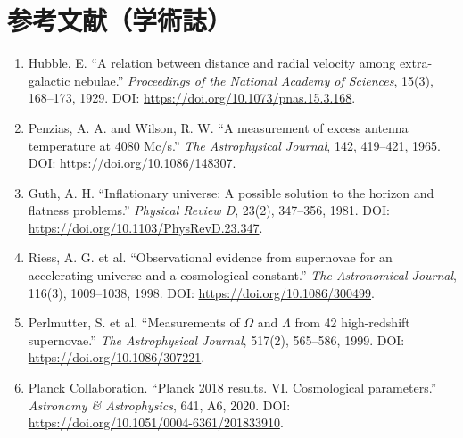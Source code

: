 \section*{参考文献（学術誌）}
\begin{enumerate}[leftmargin=2.4em]
\item Hubble, E. ``A relation between distance and radial velocity among extra-galactic nebulae.'' \textit{Proceedings of the National Academy of Sciences}, 15(3), 168--173, 1929. DOI: \url{https://doi.org/10.1073/pnas.15.3.168}.
\item Penzias, A. A. and Wilson, R. W. ``A measurement of excess antenna temperature at 4080 Mc/s.'' \textit{The Astrophysical Journal}, 142, 419--421, 1965. DOI: \url{https://doi.org/10.1086/148307}.
\item Guth, A. H. ``Inflationary universe: A possible solution to the horizon and flatness problems.'' \textit{Physical Review D}, 23(2), 347--356, 1981. DOI: \url{https://doi.org/10.1103/PhysRevD.23.347}.
\item Riess, A. G. et al. ``Observational evidence from supernovae for an accelerating universe and a cosmological constant.'' \textit{The Astronomical Journal}, 116(3), 1009--1038, 1998. DOI: \url{https://doi.org/10.1086/300499}.
\item Perlmutter, S. et al. ``Measurements of \(\Omega\) and \(\Lambda\) from 42 high-redshift supernovae.'' \textit{The Astrophysical Journal}, 517(2), 565--586, 1999. DOI: \url{https://doi.org/10.1086/307221}.
\item Planck Collaboration. ``Planck 2018 results. VI. Cosmological parameters.'' \textit{Astronomy \& Astrophysics}, 641, A6, 2020. DOI: \url{https://doi.org/10.1051/0004-6361/201833910}.
\end{enumerate}
